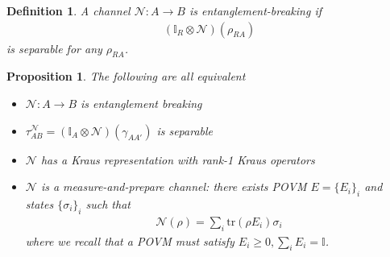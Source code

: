 \documentclass[10pt,oneside,longbibliography]{report}
\newtheorem{proposition}{Proposition}[section]
\newtheorem{definition}{Definition}[section]
\begin{document}
\begin{definition}
A channel $\mathcal{N}: A\rightarrow B$ is entanglement-breaking if 
\begin{align}
    (\mathbb{I}_R \otimes \mathcal{N})(\rho_{RA}) 
\end{align}
is separable for any $\rho_{RA}$.
\end{definition}

\begin{proposition}
The following are all equivalent
\begin{itemize}
    \item $\mathcal{N}: A\rightarrow B$ is entanglement breaking
    \item $\tau_{AB}^{\mathcal{N}}=(\mathbb{I}_A \otimes \mathcal{N})(\gamma_{AA'})$ is separable 
    \item $\mathcal{N}$ has a Kraus representation with rank-1 Kraus operators 
    \item $\mathcal{N}$ is a measure-and-prepare channel: there exists POVM $E=\{E_i\}_i$ and states $\{\sigma_i\}_i$ such that 
    \begin{align}
        \mathcal{N}(\rho) = \sum_i \text{tr}(\rho E_i) \sigma_i
    \end{align}
    where we recall that a POVM must satisfy $E_i \geq 0, \sum_i E_i = \mathbb{I}$.
\end{itemize}
\end{proposition}
\end{document}
